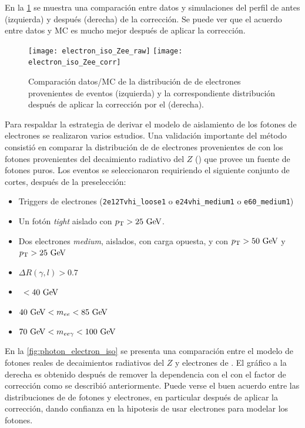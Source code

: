 En la
\cref{fig:isolation_wandwo_correction} se muestra una comparación entre datos y
simulaciones del perfil de {\etiso} antes (izquierda) y después (derecha) de
la corrección. Se puede ver que el acuerdo entre datos y MC es mucho mejor después
de aplicar la corrección.


\begin{figure}[!htbp]
  \centering

  \texttt{[image: electron\_iso\_Zee\_raw]}
  \texttt{[image: electron\_iso\_Zee\_corr]}

  \caption{Comparación datos/MC de la distribución de {\etiso} de electrones
    provenientes de eventos {\Zee} (izquierda) y la correspondiente distribución
    después de aplicar la corrección por el {\pt} (derecha).}
  \label{fig:isolation_wandwo_correction}
\end{figure}


Para respaldar la estrategia de derivar el modelo de aislamiento de los fotones
de electrones se realizaron varios estudios. Una validación importante del método
consistió en comparar la distribución de {\etiso} de electrones provenientes de
{\Zee} con los fotones provenientes del decaimiento radiativo del $Z$ (\Zee\gam) que provee un fuente
de fotones puros. Los eventos se seleccionaron requiriendo el siguiente conjunto
de cortes, después de la preselección:

\begin{itemize}\itemsep0.1cm
\item Triggers de electrones (\texttt{2e12Tvhi\_loose1} o \texttt{e24vhi\_medium1} o \texttt{e60\_medium1})
\item Un fotón \emph{tight} aislado con $\pt>25 \gev$.
\item Dos electrones \emph{medium}, aislados, con carga opuesta, y con $\pt>50 \gev$ y $\pt>25 \gev$
\item $\Delta R(\gamma,l)>0.7$
\item \MET\ $<40\gev$
\item $40\gev<m_{ee}<85\gev$
\item $70\gev<m_{ee\gamma}<100\gev$
\end{itemize}

En la \cref{fig:photon_electron_iso} se presenta una comparación entre el modelo
de fotones reales de decaimientos radiativos del $Z$ y electrones de {\Zee}. El
gráfico a la derecha es obtenido después de remover la dependencia con el {\pt}
con el factor de corrección como se describió anteriormente. Puede verse
el buen acuerdo entre las distribuciones de {\etiso} de fotones y
electrones, en particular después de aplicar la corrección, dando confianza en la
hipotesis de usar electrones para modelar los fotones.

